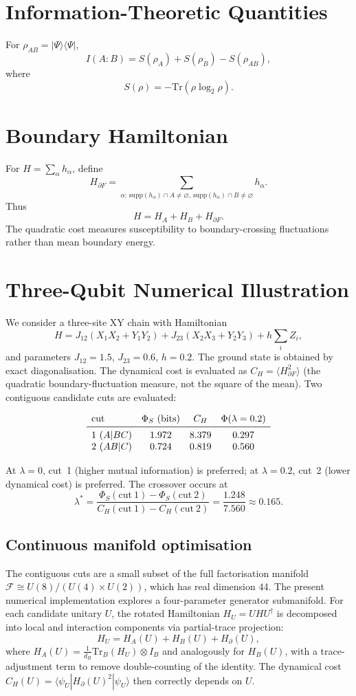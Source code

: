 \documentclass[11pt]{article}
\begin{document}
\section{Information-Theoretic Quantities}
For $\rho_{AB}=|\Psi\rangle\langle\Psi|$,
\[
I(A:B)=S(\rho_A)+S(\rho_B)-S(\rho_{AB}),
\]
where
\[
S(\rho)=-\mathrm{Tr}(\rho\log_2\rho).
\]

\section{Boundary Hamiltonian}
For $H=\sum_\alpha h_\alpha$, define
\[
H_{\partial F}=\sum_{\alpha:\,\mathrm{supp}(h_\alpha)\cap A\neq\varnothing,\,
\mathrm{supp}(h_\alpha)\cap B\neq\varnothing} h_\alpha.
\]
Thus
\[
H=H_A+H_B+H_{\partial F}.
\]
The quadratic cost measures susceptibility to boundary-crossing fluctuations rather than mean boundary energy.

\section{Three-Qubit Numerical Illustration}

We consider a three-site XY chain with Hamiltonian
\[
H = J_{12}(X_1X_2+Y_1Y_2) + J_{23}(X_2X_3+Y_2Y_3) + h\sum_i Z_i,
\]
and parameters $J_{12}=1.5$, $J_{23}=0.6$, $h=0.2$. The ground state is obtained by exact diagonalisation. The dynamical cost is evaluated as $C_H = \langle H_{\partial F}^2\rangle$ (the quadratic boundary-fluctuation measure, not the square of the mean). Two contiguous candidate cuts are evaluated:

\[
\begin{array}{lccc}
\text{cut} & \Phi_S\ (\text{bits}) & C_H & \Phi(\lambda=0.2) \\ \midrule
1\ (A|BC) & 1.972 & 8.379 & 0.297 \\
2\ (AB|C) & 0.724 & 0.819 & 0.560
\end{array}
\]

At $\lambda=0$, cut~1 (higher mutual information) is preferred; at $\lambda=0.2$, cut~2 (lower dynamical cost) is preferred. The crossover occurs at
\[
\lambda^* = \frac{\Phi_S(\text{cut}~1)-\Phi_S(\text{cut}~2)}
{C_H(\text{cut}~1)-C_H(\text{cut}~2)}
= \frac{1.248}{7.560} \approx 0.165.
\]

\subsection{Continuous manifold optimisation}
The contiguous cuts are a small subset of the full factorisation manifold $\mathcal F \cong U(8)/(U(4)\times U(2))$, which has real dimension $44$. The present numerical implementation explores a four-parameter generator submanifold. For each candidate unitary $U$, the rotated Hamiltonian $H_U = U H U^\dagger$ is decomposed into local and interaction components via partial-trace projection:
\[
H_U = H_A(U) + H_B(U) + H_{\partial}(U),
\]
where $H_A(U) = \frac{1}{d_B}\mathrm{Tr}_B(H_U)\otimes I_B$ and analogously for $H_B(U)$, with a trace-adjustment term to remove double-counting of the identity. The dynamical cost $C_H(U) = \langle \psi_U | H_{\partial}(U)^2 | \psi_U \rangle$ then correctly depends on $U$.
\end{document}
